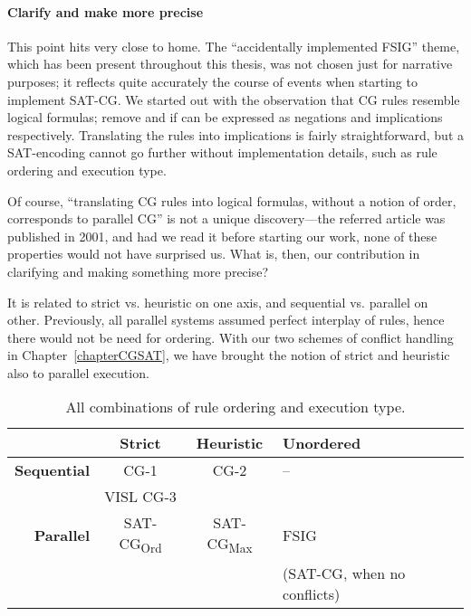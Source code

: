 \paragraph{Clarify and make more precise} This point hits very close to home.
The ``accidentally implemented FSIG'' theme, which has been present throughout this thesis, was not chosen just for narrative purposes; it reflects quite accurately the course of events when starting to implement SAT-CG.
We started out with the observation that CG rules resemble logical formulas; {\sc remove} and {\sc if } can be expressed as negations and implications respectively. 
Translating the rules into implications is fairly straightforward, but a SAT-encoding cannot go further without implementation details, such as rule ordering and execution type. 

Of course, ``translating CG rules into logical formulas, without a notion of order, corresponds to parallel CG'' is not a unique discovery---the referred article was published in 2001, and had we read it before starting our work, none of these properties would not have surprised us.
What is, then, our contribution in clarifying and making something more precise?


It is related to strict vs. heuristic on one axis, and sequential vs. parallel on other.
Previously, all parallel systems assumed perfect interplay of rules, hence there would not be need for ordering.
With our two schemes of conflict handling in Chapter~\ref{chapterCGSAT}, we have brought the notion of strict and heuristic also to parallel execution.



\def\satcgMax{SAT-CG\textsubscript{Max}}
\def\satcgOrd{SAT-CG\textsubscript{Ord}}

\begin{table}
\centering

  \begin{tabular}{r | c | c | p{3cm}}
           & \textbf{Strict} & \textbf{Heuristic} & \textbf{Unordered} \\ \hline
\textbf{Sequential}
           & CG-1            & CG-2               & --           \\ 
           & VISL CG-3       &                    &              \\ \hline
\textbf{Parallel}
		   & \satcgOrd       & \satcgMax          & FSIG \\ 
		   &                 &                    & (SAT-CG, 
		   											when no conflicts) \\
  \end{tabular}
  \label{table:nelikentta}
  \caption{All combinations of rule ordering and execution type.}
\end{table}


